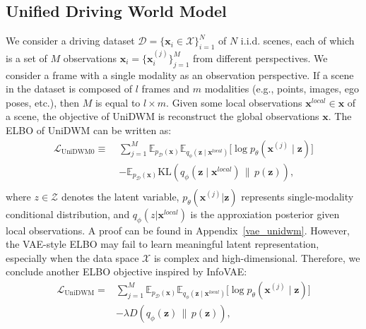 \subsection{Unified Driving World Model}
We consider a driving dataset $\mathcal{D} = \{ \mathbf{x}_i \in \mathcal{X}\}_{i=1}^{N}$ of $N$ i.i.d. scenes, each of which is a set of $M$ observations $\mathbf{x}_i = \{\boldsymbol{x}_i^{(j)}\}_{j=1}^{M}$ from different perspectives. We consider a frame with a single modality as an observation perspective. If a scene in the dataset is composed of $l$ frames and $m$ modalities (e.g., points, images, ego poses, etc.), then $M$ is equal to $l \times m$. Given some local observations $\mathbf{x}^{local} \in \mathbf{x}$ of a scene, the objective of UniDWM is reconstruct the global observations $\mathbf{x}$. The ELBO of UniDWM can be written as:
\begin{equation}
\begin{aligned}
\mathcal{L}_{\text{UniDWM0}} \equiv\;&
 {\textstyle \sum_{j=1}^{M}} \mathbb{E}_{p_{\mathcal{D}}(\mathbf{x})}
\mathbb{E}_{q_\phi(\mathbf{z} \mid \mathbf{x}^{local})}
\big[ \log p_\theta(\boldsymbol{x}^{(j)} \mid \mathbf{z}) \big] \\
&- 
\mathbb{E}_{p_{\mathcal{D}}(\mathbf{x})}
\mathrm{KL}\!\left(q_\phi(\mathbf{z} \mid \mathbf{x}^{local}) \,\|\, p(\mathbf{z})\right), \\
\end{aligned}
\label{Eq:unidwm0}
\end{equation}
where $z \in \mathcal{Z}$ denotes the latent variable, $p_{\theta}(\boldsymbol{x}^{(j)}|\mathbf{z})$ represents single-modality conditional distribution, and $q_{\phi}(z | \mathbf{x}^{local})$ is the approxiation posterior given local observations. A proof can be found in Appendix~\ref{vae_unidwm}. However, the VAE-style ELBO may fail to learn meaningful latent representation, especially when the data space $\mathcal{X}$ is complex and high-dimensional. Therefore, we conclude another ELBO objective inspired by InfoVAE:
\begin{equation}
\begin{aligned}
\mathcal{L}_{\text{UniDWM}} =&
 {\textstyle \sum_{j=1}^{M}} \mathbb{E}_{p_{\mathcal{D}}(\mathbf{x})}
\mathbb{E}_{q_\phi(\mathbf{z} \mid \mathbf{x}^{local})}
\big[ \log p_\theta(\boldsymbol{x}^{(j)} \mid \mathbf{z}) \big] \\
&- \lambda D(q_{\phi}(\mathbf{z})\,\|\,p(\mathbf{z})), \\ 
\end{aligned}
\label{Eq:unidwm}
\end{equation}
